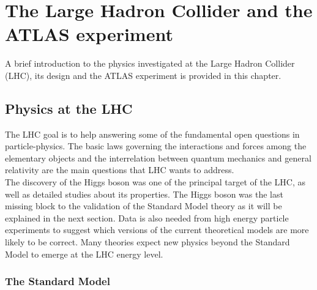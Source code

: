 \section{The Large Hadron Collider and the ATLAS experiment}\label{sec:LHC and ATLAS}

A brief introduction to the physics investigated at the Large Hadron Collider (LHC)\cite{lhc}, its design and the ATLAS\cite{atlas1,atlas2} experiment is provided in this chapter.

\subsection{Physics at the LHC}

The LHC goal is to help answering some of the fundamental open questions in particle-physics. The basic laws governing the interactions and forces among the elementary objects and the interrelation between quantum mechanics and general relativity are the main questions that LHC wants to address.\\
The discovery of the Higgs boson was one of the principal target of the LHC, as well as detailed studies about its properties. The Higgs boson was the last missing block to the validation of the Standard Model theory\cite{SM1,SM2,SM3} as it will be explained in the next section.
Data is also needed from high energy particle experiments to suggest which versions of the current theoretical models are more likely to be correct. Many theories \cite{theories} expect new physics beyond the Standard Model to emerge at the LHC energy level. %


\subsubsection{The Standard Model}

